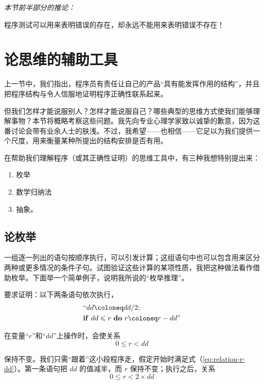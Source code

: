 \noindent
\textit{本节前半部分的推论：}
\nopagebreak

程序测试可以用来表明错误的存在，却永远不能用来表明错误不存在！

\section[论思维的辅助工具]{论思维的辅助工具}
\label{sec:out-mental-aids}

上一节中，我们指出，程序员有责任让自己的产品“具有能发挥作用的结构”，并且把程序结构与令人信服地证明程序正确性联系起来。

但我们怎样才能说服别人？怎样才能说服自己？哪些典型的思维方式使我们能够理解事物？本节将概略考察这些问题。我先向专业心理学家致以诚挚的歉意，因为这番讨论会带有业余人士的肤浅。不过，我希望——也相信——它足以为我们提供一个尺度，用来衡量某种所提出的结构安排是否有用。

在帮助我们理解程序（或其正确性证明）的思维工具中，有三种我想特别提出来：

\begin{enumerate}[wide, nosep, label=(\arabic*)]
\item 枚举
\item 数学归纳法
\item 抽象。
\end{enumerate}


\subsection{论枚举}
\label{subsec:enumeration}

一组逐一列出的语句按顺序执行，可以引发计算；这组语句中也可以包含用来区分两种或更多情况的条件子句。试图验证这些计算的某项性质，我把这种做法看作借助枚举。下面举一个简单例子，说明我所说的“枚举推理”。

要求证明：以下两条语句依次执行，
\begin{equation*}
	\begin{split}
		&\text{``}dd \coloneq dd/2; \\
		&\text{\textbf{if} } dd \leqslant r \text{ \textbf{do} } r \coloneq r - dd\text{''}
	\end{split}
\end{equation*}

\noindent
在变量“$r$”和“$dd$”上操作时，会使关系
\begin{equation}
	\label{eq:relation-r-dd}
	0 \leqslant r < dd
\end{equation}

\noindent
保持不变。我们只需“跟着”这小段程序走，假定开始时满足式（\ref{eq:relation-r-dd}）。第一条语句把 $dd$ 的值减半，而 $r$ 保持不变；执行之后，关系
\begin{equation}
	\label{eq:relation-r-2dd}
	0 \leqslant r < 2\times dd
\end{equation}

